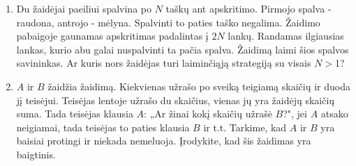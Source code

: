 \begin{enumerate}
\item {} Du žaidėjai paeiliui spalvina po
  $N$ taškų ant apskritimo. Pirmojo spalva - raudona, antrojo - mėlyna.
  Spalvinti to paties taško negalima. Žaidimo pabaigoje gaunamas
  apskritimas padalintas į $2N$ lankų. Randamas ilgiausias lankas, kurio
  abu galai nuspalvinti ta pačia spalva. Žaidimą laimi šios spalvos
  savininkas. Ar kuris nors žaidėjas turi laiminčiąją strategiją su visais
  $N>$1? 

%

\item {} $A$ ir $B$ žaidžia žaidimą. Kiekvienas
  užrašo po sveiką teigiamą skaičių ir duoda jį teisėjui. Teisėjas lentoje
  užrašo du skaičius, vienas jų yra žaidėjų skaičių suma. Tada teisėjas
  klausia $A$: „Ar žinai kokį skaičių užrašė $B$?", jei $A$ atsako
  neigiamai, tada teisėjas to paties klausia $B$ ir t.t. Tarkime, kad $A$
  ir $B$ yra baisiai protingi ir niekada nemeluoja. Įrodykite, kad šis
  žaidimas yra baigtinis.


\end{enumerate}

